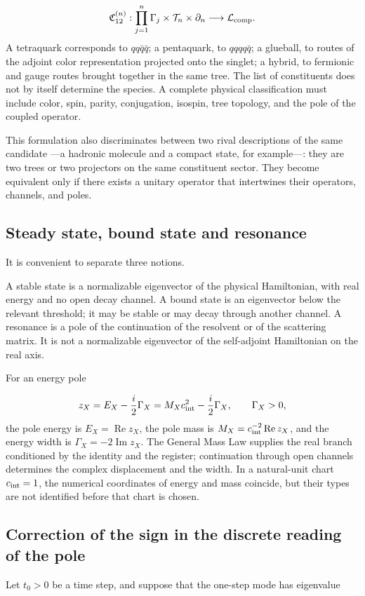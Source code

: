 \[
\mathfrak C_{12}^{(n)}:
\prod_{j=1}^{n}\Gamma_j\times\mathcal T_n\times\partial_n
\longrightarrow\mathcal L_{\rm comp}.
\]
A tetraquark corresponds to \(qq\bar q\bar q\); a pentaquark, to \(qqqq\bar q\); a glueball, to routes of the adjoint color representation projected onto the singlet; a hybrid, to fermionic and gauge routes brought together in the same tree. The list of constituents does not by itself determine the species. A complete physical classification must include color, spin, parity, conjugation, isospin, tree topology, and the pole of the coupled operator.

This formulation also discriminates between two rival descriptions of the same candidate ---a hadronic molecule and a compact state, for example---: they are two trees or two projectors on the same constituent sector. They become equivalent only if there exists a unitary operator that intertwines their operators, channels, and poles.

\subsection{Steady state, bound state and resonance}
It is convenient to separate three notions.

A stable state is a normalizable eigenvector of the physical Hamiltonian, with real energy and no open decay channel. A bound state is an eigenvector below the relevant threshold; it may be stable or may decay through another channel. A resonance is a pole of the continuation of the resolvent or of the scattering matrix. It is not a normalizable eigenvector of the self-adjoint Hamiltonian on the real axis.

For an energy pole

\[
z_X=E_X-\frac{i}{2}\Gamma_X
=M_Xc_{\rm int}^{2}-\frac{i}{2}\Gamma_X,
\qquad \Gamma_X>0,
\]
the pole energy is \(E_X=\operatorname{Re}z_X\), the pole mass is \(M_X=c_{\rm int}^{-2}\operatorname{Re}z_X\), and the energy width is \(\Gamma_X=-2\operatorname{Im}z_X\). The General Mass Law supplies the real branch conditioned by the identity and the register; continuation through open channels determines the complex displacement and the width. In a natural-unit chart \(c_{\rm int}=1\), the numerical coordinates of energy and mass coincide, but their types are not identified before that chart is chosen.

\subsection{Correction of the sign in the discrete reading of the pole}
Let \(t_0>0\) be a time step, and suppose that the one-step mode has eigenvalue

